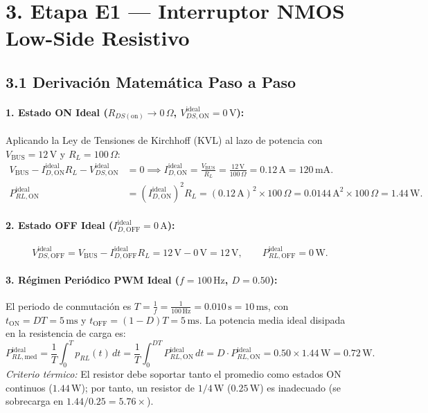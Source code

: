 \documentclass[10pt, a4paper, landscape]{article}
\begin{document}
\section*{3. Etapa E1 — Interruptor NMOS Low-Side Resistivo}

\subsection*{3.1 Derivación Matemática Paso a Paso}

\paragraph{1. Estado ON Ideal ($R_{DS(\text{on})} \rightarrow 0\,\Omega$, $V_{DS,\text{ON}}^{\text{ideal}} = 0\,\text{V}$):}
Aplicando la Ley de Tensiones de Kirchhoff (KVL) al lazo de potencia con $V_{\text{BUS}} = 12\,\text{V}$ y $R_L = 100\,\Omega$:
\begin{align}
    V_{\text{BUS}} - I_{D,\text{ON}}^{\text{ideal}} R_L - V_{DS,\text{ON}}^{\text{ideal}} &= 0 \implies I_{D,\text{ON}}^{\text{ideal}} = \frac{V_{\text{BUS}}}{R_L} = \frac{12\,\text{V}}{100\,\Omega} = 0.12\,\text{A} = 120\,\text{mA}. \\
    P_{RL,\text{ON}}^{\text{ideal}} &= \left(I_{D,\text{ON}}^{\text{ideal}}\right)^2 R_L = (0.12\,\text{A})^2 \times 100\,\Omega = 0.0144\,\text{A}^2 \times 100\,\Omega = 1.44\,\text{W}.
\end{align}

\paragraph{2. Estado OFF Ideal ($I_{D,\text{OFF}}^{\text{ideal}} = 0\,\text{A}$):}
\begin{equation}
    V_{DS,\text{OFF}}^{\text{ideal}} = V_{\text{BUS}} - I_{D,\text{OFF}}^{\text{ideal}} R_L = 12\,\text{V} - 0\,\text{V} = 12\,\text{V}, \qquad P_{RL,\text{OFF}}^{\text{ideal}} = 0\,\text{W}.
\end{equation}

\paragraph{3. Régimen Periódico PWM Ideal ($f = 100\,\text{Hz}$, $D = 0.50$):}
El periodo de conmutación es $T = \frac{1}{f} = \frac{1}{100\,\text{Hz}} = 0.010\,\text{s} = 10\,\text{ms}$, con $t_{\text{ON}} = D T = 5\,\text{ms}$ y $t_{\text{OFF}} = (1-D)T = 5\,\text{ms}$. La potencia media ideal disipada en la resistencia de carga es:
\begin{equation}
    P_{RL,\text{med}}^{\text{ideal}} = \frac{1}{T}\int_0^T p_{RL}(t)\,dt = \frac{1}{T}\int_0^{D T} P_{RL,\text{ON}}^{\text{ideal}}\,dt = D \cdot P_{RL,\text{ON}}^{\text{ideal}} = 0.50 \times 1.44\,\text{W} = 0.72\,\text{W}.
\end{equation}
\textit{Criterio térmico:} El resistor debe soportar tanto el promedio como estados ON continuos ($1.44\,\text{W}$); por tanto, un resistor de $1/4\,\text{W}$ ($0.25\,\text{W}$) es inadecuado (se sobrecarga en $1.44 / 0.25 = 5.76\times$).
\end{document}
